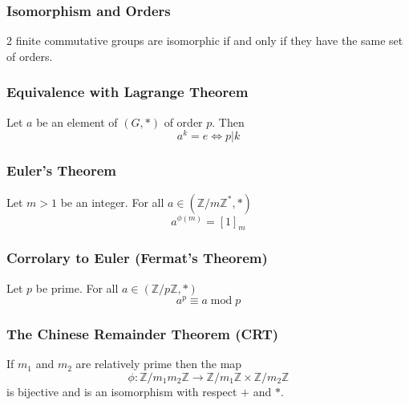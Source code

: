\documentclass{article}
\begin{document}
\subsubsection{Isomorphism and Orders}
\begin{tcolorbox}[sharp corners, colback=green!30, colframe=green!80!blue, title=Relation with Isomorphism and orders]
2 finite commutative groups are isomorphic if and only if they have the same set of orders.
\end{tcolorbox}

\subsubsection{Equivalence with Lagrange Theorem} Let $ a $ be an element of $ (G, *) $ of order $ p $. Then
\begin{equation}
a^k = e \Leftrightarrow p | k
\end{equation}

\subsubsection{Euler's Theorem}
\begin{tcolorbox}[sharp corners, colback=green!30, colframe=green!80!blue, title=Euler's Theorem]
Let $ m > 1 $ be an integer. For all $ a \in (\mathbb{Z}/m\mathbb{Z}^{*}, *) $
\begin{equation}
a^{\phi(m)} = [1]_m
\end{equation}
\end{tcolorbox}

\subsubsection{Corrolary to Euler (Fermat's Theorem)}
\begin{tcolorbox}[sharp corners, colback=green!30, colframe=green!80!blue, title=Fermat's Theorem]
Let $ p $ be prime. For all $ a \in (\mathbb{Z}/p\mathbb{Z}, *) $ 
\begin{equation}
a^p \equiv a \;\mathrm{mod}\; p
\end{equation}
\end{tcolorbox}

\subsubsection{The Chinese Remainder Theorem (CRT)} If $ m_1 $ and $ m_2 $ are relatively prime then the map 
\begin{equation}
\phi: \mathbb{Z}/m_1m_2\mathbb{Z} \rightarrow \mathbb{Z}/m_1\mathbb{Z} \times \mathbb{Z}/m_2\mathbb{Z}
\end{equation}
is bijective and is an isomorphism with respect $ + $ and $ * $.
\end{document}
